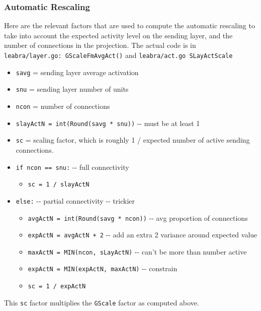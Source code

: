 \hypertarget{automatic-rescaling}{%
\subsubsection{Automatic Rescaling}\label{automatic-rescaling}}

Here are the relevant factors that are used to compute the automatic
rescaling to take into account the expected activity level on the
sending layer, and the number of connections in the projection. The
actual code is in \texttt{leabra/layer.go:\ GScaleFmAvgAct()} and
\texttt{leabra/act.go\ SLayActScale}

\begin{itemize}
\tightlist
\item
  \texttt{savg} = sending layer average activation
\item
  \texttt{snu} = sending layer number of units
\item
  \texttt{ncon} = number of connections
\item
  \texttt{slayActN\ =\ int(Round(savg\ *\ snu))} -\/- must be at least 1
\item
  \texttt{sc} = scaling factor, which is roughly 1 / expected number of
  active sending connections.
\item
  \texttt{if\ ncon\ ==\ snu:} -\/- full connectivity

  \begin{itemize}
  \tightlist
  \item
    \texttt{sc\ =\ 1\ /\ slayActN}
  \end{itemize}
\item
  \texttt{else:} -\/- partial connectivity -\/- trickier

  \begin{itemize}
  \tightlist
  \item
    \texttt{avgActN\ =\ int(Round(savg\ *\ ncon))} -\/- avg proportion
    of connections
  \item
    \texttt{expActN\ =\ avgActN\ +\ 2} -\/- add an extra 2 variance
    around expected value
  \item
    \texttt{maxActN\ =\ MIN(ncon,\ sLayActN)} -\/- can't be more than
    number active
  \item
    \texttt{expActN\ =\ MIN(expActN,\ maxActN)} -\/- constrain
  \item
    \texttt{sc\ =\ 1\ /\ expActN}
  \end{itemize}
\end{itemize}

This \texttt{sc} factor multiplies the \texttt{GScale} factor as
computed above.
